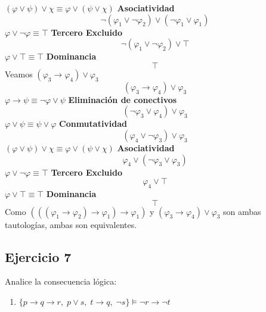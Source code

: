 \documentclass[a4paper]{article}
\begin{document}
    $(\varphi \lor \psi) \lor \chi \equiv \varphi \lor (\psi \lor \chi)$ \textbf{Asociatividad}
    \[
        \neg (\varphi_1 \lor \neg \varphi_2) \lor (\neg \varphi_1 \lor \varphi_1)
    \]
    $\varphi \lor \neg \varphi \equiv \top$ \textbf{Tercero Excluido}
    \[
        \neg (\varphi_1 \lor \neg \varphi_2) \lor \top
    \]
    $\varphi \lor \top \equiv \top$ \textbf{Dominancia}
    \[
        \top
    \]
    Veamos $(\varphi_3 \rightarrow \varphi_4) \lor \varphi_3$
    \[
        (\varphi_3 \rightarrow \varphi_4) \lor \varphi_3
    \]
    $\varphi \rightarrow \psi \equiv \neg \varphi \lor \psi$ \textbf{Eliminación de conectivos}
    \[
        (\neg \varphi_3 \lor \varphi_4) \lor \varphi_3
    \]
    $\varphi \lor \psi \equiv \psi \lor \varphi$ \textbf{Conmutatividad}
    \[
        ( \varphi_4 \lor \neg \varphi_3) \lor \varphi_3
    \]
    $(\varphi \lor \psi) \lor \chi \equiv \varphi \lor (\psi \lor \chi)$ \textbf{Asociatividad}
    \[
        \varphi_4 \lor (\neg \varphi_3 \lor \varphi_3)
    \]
    $\varphi \lor \neg \varphi \equiv \top$ \textbf{Tercero Excluido}  
    \[
        \varphi_4 \lor \top
    \]
    $\varphi \lor \top \equiv \top$ \textbf{Dominancia}
    \[
        \top
    \]
    Como $((( \varphi_1 \rightarrow \varphi_2) \rightarrow \varphi_1) \rightarrow \varphi_1)$ y $(\varphi_3 \rightarrow \varphi_4) \lor \varphi_3$ son ambas tautologías, ambas son equivalentes.
\subsection*{Ejercicio 7}
Analice la consecuencia l\'ogica:
\begin{enumerate}
 \item $\{p \to q \to r,\; p\lor s,\; t \to q,\;\lnot s \} \models
 \lnot r  \to\lnot t$
\end{enumerate}
\end{document}
